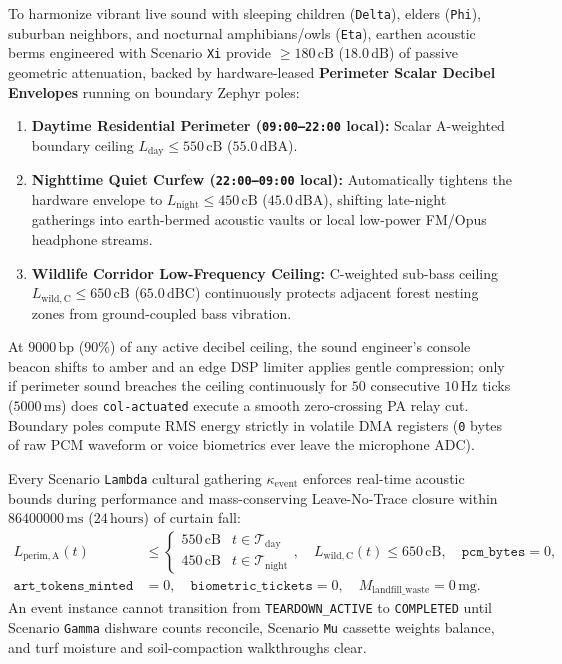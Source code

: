 To harmonize vibrant live sound with sleeping children (\texttt{Delta}), elders (\texttt{Phi}), suburban
neighbors, and nocturnal amphibians/owls (\texttt{Eta}), earthen acoustic berms engineered with Scenario
\texttt{Xi} provide $\ge 180\,\mathrm{cB}$ ($18.0\,\mathrm{dB}$) of passive geometric attenuation, backed by
hardware-leased \textbf{Perimeter Scalar Decibel Envelopes} running on boundary Zephyr poles:
\begin{enumerate}
    \item \textbf{Daytime Residential Perimeter (\texttt{09:00--22:00} local):} Scalar A-weighted boundary
    ceiling $L_{\mathrm{day}} \le 550\,\mathrm{cB}$ ($55.0\,\mathrm{dBA}$).
    \item \textbf{Nighttime Quiet Curfew (\texttt{22:00--09:00} local):} Automatically tightens the
    hardware envelope to $L_{\mathrm{night}} \le 450\,\mathrm{cB}$ ($45.0\,\mathrm{dBA}$), shifting late-night
    gatherings into earth-bermed acoustic vaults or local low-power FM/Opus headphone streams.
    \item \textbf{Wildlife Corridor Low-Frequency Ceiling:} C-weighted sub-bass ceiling
    $L_{\mathrm{wild,C}} \le 650\,\mathrm{cB}$ ($65.0\,\mathrm{dBC}$) continuously protects adjacent forest
    nesting zones from ground-coupled bass vibration.
\end{enumerate}

At $9000\,\mathrm{bp}$ ($90\%$) of any active decibel ceiling, the sound engineer's console beacon shifts
to amber and an edge DSP limiter applies gentle compression; only if perimeter sound breaches the ceiling
continuously for $50$ consecutive $10\,\mathrm{Hz}$ ticks ($5000\,\mathrm{ms}$) does \texttt{col-actuated}
execute a smooth zero-crossing PA relay cut. Boundary poles compute RMS energy strictly in volatile DMA
registers (\texttt{0} bytes of raw PCM waveform or voice biometrics ever leave the microphone ADC).

\begin{invariant}
\label{inv:lambda-culture}
Every Scenario \texttt{Lambda} cultural gathering $\kappa_{\mathrm{event}}$ enforces real-time acoustic
bounds during performance and mass-conserving Leave-No-Trace closure within $86400000\,\mathrm{ms}$
($24\,\mathrm{hours}$) of curtain fall:
\begin{align}
L_{\mathrm{perim,A}}(t) &\le \begin{cases} 550\,\mathrm{cB} & t \in \mathcal{T}_{\mathrm{day}} \\ 450\,\mathrm{cB} & t \in \mathcal{T}_{\mathrm{night}} \end{cases}, \quad
L_{\mathrm{wild,C}}(t) \le 650\,\mathrm{cB}, \quad \mathtt{pcm\_bytes} = 0, \\
\mathtt{art\_tokens\_minted} &= 0, \quad \mathtt{biometric\_tickets} = 0, \quad M_{\mathrm{landfill\_waste}} = 0\,\mathrm{mg}.
\end{align}
An event instance cannot transition from \texttt{TEARDOWN\_ACTIVE} to \texttt{COMPLETED} until Scenario
\texttt{Gamma} dishware counts reconcile, Scenario \texttt{Mu} cassette weights balance, and turf moisture
and soil-compaction walkthroughs clear.
\end{invariant}


